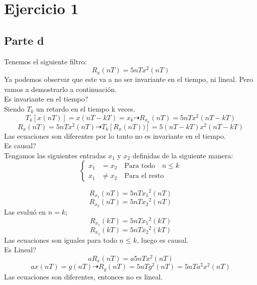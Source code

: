 \documentclass{report}
\begin{document}


\tableofcontents
\newpage

\chapter*{Ejercicio 1}

\section{Parte d}
Tenemos el siguiente filtro:
$$R_x(nT) = 5nTx^2(nT)$$
Ya podemos observar que este va a no ser invariante en el tiempo, ni lineal. Pero vamos a demostrarlo a continuaci\'on.\\
Es invariante en el tiempo?\\
Siendo $T_k$ un retardo en el tiempo k veces.\\
$$T_k[x(nT)] = x(nT-kT) = x_k\dashrightarrow R_{x_{k}}(nT) = 5nTx^2(nT-kT)$$
$$R_x(nT) = 5nTx^2(nT)\dashrightarrow T_k[R_x(nT))] = 5(nT-kT)x^2(nT-kT)$$
Las ecuaciones son diferentes por lo tanto no es invariante en el tiempo.\\
Es causal?\\
Tengamos las siguientes entradas $x_1$ y $x_2$ definidas de la siguiente manera:\\
\begin{equation*}
\left\{
\begin{aligned}
x_1 & = x_2 \quad\text{Para todo}\quad n\leq k\\
x_1 & \neq x_2 \quad\text{Para el resto}
\end{aligned}
\right.
\end{equation*}

$$R_{x_{1}}(nT) = 5nT{x_1}^2(nT)$$
$$R_{x_{2}}(nT) = 5nT{x_2}^2(nT)$$
Las evalu\'o en $n=k$;\\
$$R_{x_{1}}(kT) = 5nT{x_1}^2(kT)$$
$$R_{x_{2}}(kT) = 5nT{x_2}^2(kT)$$
Las ecuaciones son iguales para todo $n\leq k$, luego es causal.\\
Es Lineal?\\
$$aR_x(nT) = a5nTx^2(nT)$$
$$ax(nT)=g(nT)\dashrightarrow R_g(nT) = 5nTg^2(nT) =5nTa^2x^2(nT) $$
Las ecuaciones son diferentes, entonces no es lineal.\\
\end{document}
